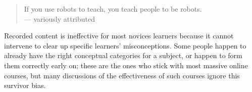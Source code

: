 
\begin{quote}
  If you use robots to teach, you teach people to be robots.
  \\
  --- variously attributed
\end{quote}

Recorded content is ineffective for most novices learners because it
cannot intervene to clear up specific learners' misconceptions. Some
people happen to already have the right conceptual categories for a
subject, or happen to form them correctly early on; these are the ones
who stick with most massive online courses, but many discussions of
the effectiveness of such courses ignore this survivor bias.
